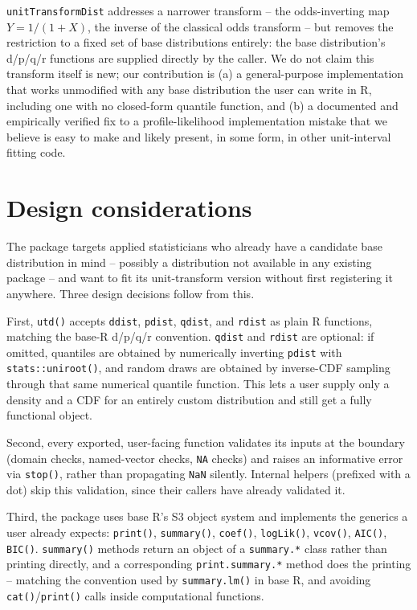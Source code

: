 \documentclass[11pt]{article}
\begin{document}
\texttt{unitTransformDist} addresses a narrower transform -- the
odds-inverting map $Y = 1/(1+X)$, the inverse of the classical odds
transform -- but removes the restriction to a fixed set of base
distributions entirely: the base distribution's d/p/q/r functions are
supplied directly by the caller. We do not claim this transform itself
is new; our contribution is (a) a general-purpose implementation that
works unmodified with any base distribution the user can write in R,
including one with no closed-form quantile function, and (b) a
documented and empirically verified fix to a profile-likelihood
implementation mistake that we believe is easy to make and likely
present, in some form, in other unit-interval fitting code.

\section{Design considerations}

The package targets applied statisticians who already have a candidate
base distribution in mind -- possibly a distribution not available in
any existing package -- and want to fit its unit-transform version
without first registering it anywhere. Three design decisions follow
from this.

First, \texttt{utd()} accepts \texttt{ddist}, \texttt{pdist},
\texttt{qdist}, and \texttt{rdist} as plain R functions, matching the
base-R d/p/q/r convention. \texttt{qdist} and \texttt{rdist} are
optional: if omitted, quantiles are obtained by numerically inverting
\texttt{pdist} with \texttt{stats::uniroot()}, and random draws are
obtained by inverse-CDF sampling through that same numerical quantile
function. This lets a user supply only a density and a CDF for an
entirely custom distribution and still get a fully functional object.

Second, every exported, user-facing function validates its inputs at
the boundary (domain checks, named-vector checks, \texttt{NA} checks)
and raises an informative error via \texttt{stop()}, rather than
propagating \texttt{NaN} silently. Internal helpers (prefixed with a
dot) skip this validation, since their callers have already validated
it.

Third, the package uses base R's S3 object system and implements the
generics a user already expects: \texttt{print()}, \texttt{summary()},
\texttt{coef()}, \texttt{logLik()}, \texttt{vcov()}, \texttt{AIC()},
\texttt{BIC()}. \texttt{summary()} methods return an object of a
\texttt{summary.*} class rather than printing directly, and a
corresponding \texttt{print.summary.*} method does the printing --
matching the convention used by \texttt{summary.lm()} in base R, and
avoiding \texttt{cat()}/\texttt{print()} calls inside computational
functions.
\end{document}

